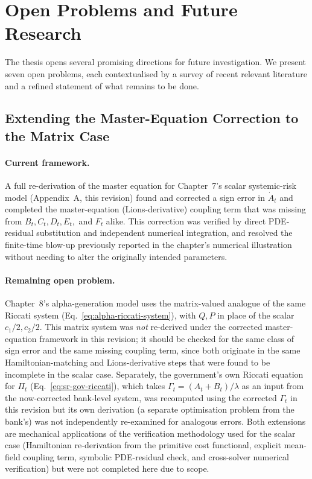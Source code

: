 \section{Open Problems and Future Research}
\label{sec:syn-open}

The thesis opens several promising directions for future investigation. We
present seven open problems, each contextualised by a survey of recent relevant
literature and a refined statement of what remains to be done.

\subsection{Extending the Master-Equation Correction to the Matrix Case}

\paragraph{Current framework.} A full re-derivation of the master equation for
Chapter~7's scalar systemic-risk model (Appendix~A, this revision) found and
corrected a sign error in $\dot{A}_t$ and completed the master-equation
(Lions-derivative) coupling term that was missing from $B_t, C_t, D_t, E_t,$
and $F_t$ alike. This correction was verified by direct PDE-residual
substitution and independent numerical integration, and resolved the
finite-time blow-up previously reported in the chapter's numerical
illustration without needing to alter the originally intended parameters.

\paragraph{Remaining open problem.} Chapter~8's alpha-generation model uses the
matrix-valued analogue of the same Riccati system (Eq.~\ref{eq:alpha-riccati-system}),
with $Q,P$ in place of the scalar $c_1/2,c_2/2$. This matrix system was
\emph{not} re-derived under the corrected master-equation framework in this
revision; it should be checked for the same class of sign error and the same
missing coupling term, since both originate in the same Hamiltonian-matching
and Lions-derivative steps that were found to be incomplete in the scalar
case. Separately, the government's own Riccati equation for $\Pi_t$
(Eq.~\ref{eq:sr-gov-riccati}), which takes $\Gamma_t=(A_t+B_t)/\lambda$ as an
input from the now-corrected bank-level system, was recomputed using the
corrected $\Gamma_t$ in this revision but its own derivation (a separate
optimisation problem from the bank's) was not independently re-examined for
analogous errors. Both extensions are mechanical applications of the
verification methodology used for the scalar case (Hamiltonian re-derivation
from the primitive cost functional, explicit mean-field coupling term,
symbolic PDE-residual check, and cross-solver numerical verification) but
were not completed here due to scope.


